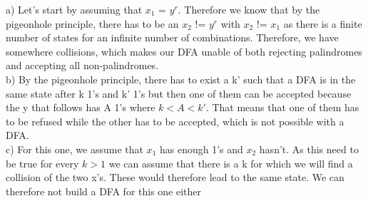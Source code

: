 
a) Let's start by assuming that $x_1$ = $y^r$. Therefore we know that by the pigeonhole principle, there has to be an $x_2$ != $y^r$ with $x_2$ != $x_1$ as there is a finite number of states for an infinite number of combinations. Therefore, we have somewhere collisions, which makes our DFA unable of both rejecting palindromes and accepting all non-palindromes.\\

b) By the pigeonhole principle, there has to exist a k' such that a DFA is in the same state after k 1's and k' 1's but then one of them can be accepted because the y that follows has A 1's where $k < A < k'$. That means that one of them has to be refused while the other has to be accepted, which is not possible with a DFA. \\

c) For this one, we assume that $x_1$ has enough 1's and $x_2$ hasn't. As this need to be true for every $k > 1$ we can assume that there is a k for which we will find a collision of the two x's. These would therefore lead to the same state. We can therefore not build a DFA for this one either